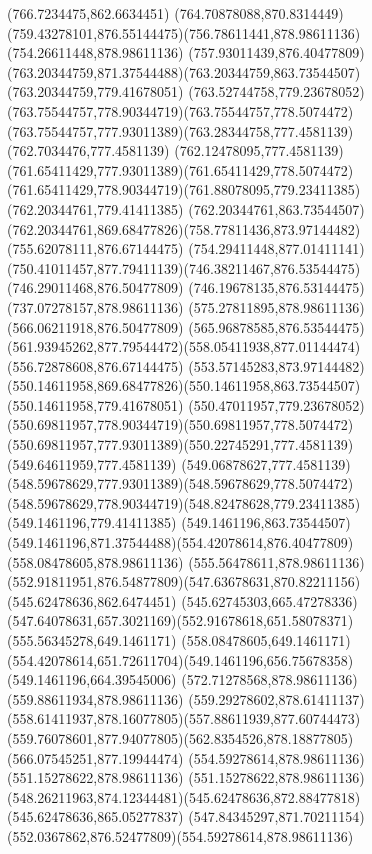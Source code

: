 {{\lineto(766.7234475,862.6634451)
\curveto(764.70878088,870.8314449)(759.43278101,876.55144475)(756.78611441,878.98611136)
\lineto(754.26611448,878.98611136)
\curveto(757.93011439,876.40477809)(763.20344759,871.37544488)(763.20344759,863.73544507)
\lineto(763.20344759,779.41678051)
\curveto(763.52744758,779.23678052)(763.75544757,778.90344719)(763.75544757,778.5074472)
\curveto(763.75544757,777.93011389)(763.28344758,777.4581139)(762.7034476,777.4581139)
\curveto(762.12478095,777.4581139)(761.65411429,777.93011389)(761.65411429,778.5074472)
\curveto(761.65411429,778.90344719)(761.88078095,779.23411385)(762.20344761,779.41411385)
\lineto(762.20344761,863.73544507)
\curveto(762.20344761,869.68477826)(758.77811436,873.97144482)(755.62078111,876.67144475)
\curveto(754.29411448,877.01411141)(750.41011457,877.79411139)(746.38211467,876.53544475)
\lineto(746.29011468,876.50477809)
\lineto(746.19678135,876.53144475)
\lineto(737.07278157,878.98611136)
\lineto(575.27811895,878.98611136)
\lineto(566.06211918,876.50477809)
\lineto(565.96878585,876.53544475)
\curveto(561.93945262,877.79544472)(558.05411938,877.01144474)(556.72878608,876.67144475)
\curveto(553.57145283,873.97144482)(550.14611958,869.68477826)(550.14611958,863.73544507)
\lineto(550.14611958,779.41678051)
\curveto(550.47011957,779.23678052)(550.69811957,778.90344719)(550.69811957,778.5074472)
\curveto(550.69811957,777.93011389)(550.22745291,777.4581139)(549.64611959,777.4581139)
\curveto(549.06878627,777.4581139)(548.59678629,777.93011389)(548.59678629,778.5074472)
\curveto(548.59678629,778.90344719)(548.82478628,779.23411385)(549.1461196,779.41411385)
\lineto(549.1461196,863.73544507)
\curveto(549.1461196,871.37544488)(554.42078614,876.40477809)(558.08478605,878.98611136)
\lineto(555.56478611,878.98611136)
\curveto(552.91811951,876.54877809)(547.63678631,870.82211156)(545.62478636,862.6474451)
\lineto(545.62745303,665.47278336)
\curveto(547.64078631,657.3021169)(552.91678618,651.58078371)(555.56345278,649.1461171)
\lineto(558.08478605,649.1461171)
\curveto(554.42078614,651.72611704)(549.1461196,656.75678358)(549.1461196,664.39545006)
\moveto(572.71278568,878.98611136)
\lineto(559.88611934,878.98611136)
\curveto(559.29278602,878.61411137)(558.61411937,878.16077805)(557.88611939,877.60744473)
\curveto(559.76078601,877.94077805)(562.8354526,878.18877805)(566.07545251,877.19944474)
\closepath
\moveto(554.59278614,878.98611136)
\lineto(551.15278622,878.98611136)
\curveto(551.15278622,878.98611136)(548.26211963,874.12344481)(545.62478636,872.88477818)
\lineto(545.62478636,865.05277837)
\curveto(547.84345297,871.70211154)(552.0367862,876.52477809)(554.59278614,878.98611136)
}}
